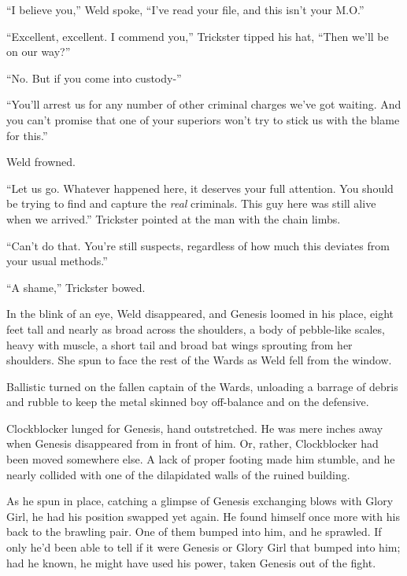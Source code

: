 ``I believe you,'' Weld spoke, ``I've read your file, and this isn't your M.O.''



``Excellent, excellent.  I commend you,'' Trickster tipped his hat, ``Then we'll be on our way?''



``No.  But if you come into custody-''



``You'll arrest us for any number of other criminal charges we've got waiting.  And you can't promise that one of your superiors won't try to stick us with the blame for this.''



Weld frowned.



``Let us go.  Whatever happened here, it deserves your full attention.  You should be trying to find and capture the \emph{real} criminals.  This guy here was still alive when we arrived.''  Trickster pointed at the man with the chain limbs.



``Can't do that.  You're still suspects, regardless of how much this deviates from your usual methods.''



``A shame,'' Trickster bowed.



In the blink of an eye, Weld disappeared, and Genesis loomed in his place, eight feet tall and nearly as broad across the shoulders, a body of pebble-like scales, heavy with muscle, a short tail and broad bat wings sprouting from her shoulders.  She spun to face the rest of the Wards as Weld fell from the window.



Ballistic turned on the fallen captain of the Wards, unloading a barrage of debris and rubble to keep the metal skinned boy off-balance and on the defensive.



Clockblocker lunged for Genesis, hand outstretched.  He was mere inches away when Genesis disappeared from in front of him.  Or, rather, Clockblocker had been moved somewhere else.  A lack of proper footing made him stumble, and he nearly collided with one of the dilapidated walls of the ruined building.



As he spun in place, catching a glimpse of Genesis exchanging blows with Glory Girl, he had his position swapped yet again.  He found himself once more with his back to the brawling pair.  One of them bumped into him, and he sprawled.  If only he'd been able to tell if it were Genesis or Glory Girl that bumped into him; had he known, he might have used his power, taken Genesis out of the fight.




